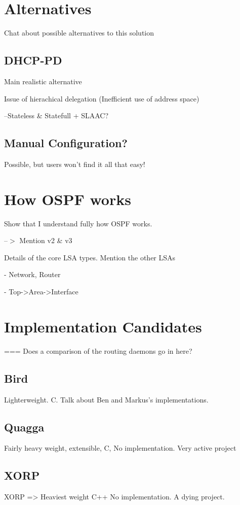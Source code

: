 \documentclass[12pt]{report}
\begin{document}
\section{Alternatives}
Chat about possible alternatives to this solution

\subsection{DHCP-PD}
Main realistic alternative

Issue of hierachical delegation (Inefficient use of address space)

--Stateless \& Statefull + SLAAC?

\subsection{Manual Configuration?}
Possible, but users won't find it all that easy!

\section{How OSPF works}
Show that I understand fully how OSPF works. 

--$>$ Mention v2 \& v3

Details of the core LSA types. Mention the other LSAs

- Network, Router 

- Top->Area->Interface

\section{Implementation Candidates}
=== Does a comparison of the routing daemons go in here?

\subsection{Bird}
Lighterweight. C. Talk about Ben and Markus's implementations.

\subsection{Quagga}
Fairly heavy weight, extensible, C, No implementation. Very active project

\subsection{XORP}
XORP => Heaviest weight C++ No implementation. A dying project.
\end{document}
